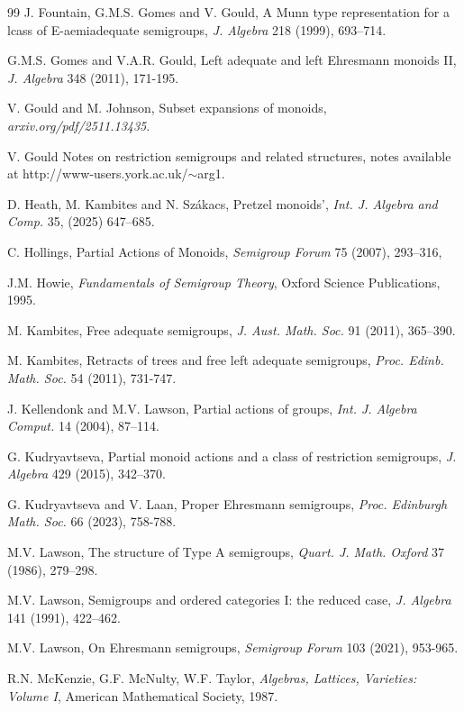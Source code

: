 \documentclass[12pt]{amsart}
\theoremstyle{definition}
\theoremstyle{definition}
\numberwithin{them}{section}
\numberwithin{equation}{section}
\begin{document}
{{\begin{thebibliography}{99}
  J. Fountain, G.M.S. Gomes and V. Gould, A Munn type representation for a lcass of
E-aemiadequate semigroups,
{\em J.  Algebra} 218 (1999), 693--714.

  G.M.S. Gomes and V.A.R. Gould, Left adequate and left Ehresmann monoids II, {\it J. Algebra} 348 (2011), 171-195.
 
 V. Gould and M. Johnson, Subset expansions of monoids, {\em arxiv.org/pdf/2511.13435}.



 V. Gould Notes on restriction semigroups and related structures, notes available at http://www-users.york.ac.uk/$\sim$arg1.


 D. Heath, M. Kambites and N. Sz\'{a}kacs, Pretzel monoids', {\em Int. J. Algebra and Comp.}  35, (2025)  647--685.

 C. Hollings, Partial Actions of Monoids, {\it Semigroup Forum} 
 75 (2007), 293--316, 

 J.M. Howie, {\em Fundamentals of Semigroup Theory}, Oxford Science Publications, 1995.


 M. Kambites, Free adequate semigroups, {\it J. Aust. Math. Soc.} 91 (2011), 365--390.

 M. Kambites, Retracts of trees and free left adequate semigroups, {\it Proc. Edinb. Math. Soc.} 54 (2011), 731-747.

 J. Kellendonk and M.V. Lawson, Partial actions of groups,  {\it Int. J. Algebra Comput.}  14 (2004), 87--114.


 G. Kudryavtseva, Partial monoid actions and a class of restriction semigroups, {\em J. Algebra}  429 (2015),  342--370.

 G. Kudryavtseva and V. Laan, Proper Ehresmann semigroups, {\it Proc. Edinburgh Math. Soc.} 66 (2023), 758-788.

 M.V. Lawson, The structure of Type A semigroups, {\em Quart. J. Math. Oxford}  37 (1986), 279--298.

 M.V. Lawson,  Semigroups and ordered categories I: the reduced case, {\em  J. Algebra}  141 (1991), 422--462.

 M.V. Lawson, On Ehresmann semigroups, {\it Semigroup Forum} 103 (2021), 953-965.

 R.N. McKenzie, G.F. McNulty, W.F. Taylor, {\em Algebras, Lattices, Varieties: Volume I}, American Mathematical Society, 1987. 


\end{thebibliography}}}
\end{document}
